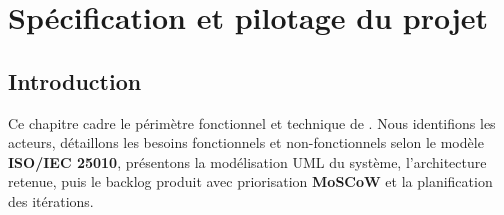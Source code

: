 %

\chapter{Spécification et pilotage du projet}

\section{Introduction}

Ce chapitre cadre le périmètre fonctionnel et technique de \tynassit{}. Nous identifions
les acteurs, détaillons les besoins fonctionnels et non-fonctionnels selon le modèle
\textbf{ISO/IEC 25010}, présentons la modélisation UML du système, l'architecture retenue,
puis le backlog produit avec priorisation \textbf{MoSCoW} et la planification des itérations.

